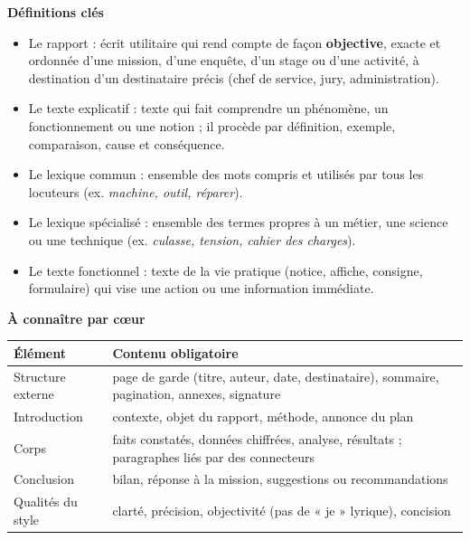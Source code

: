 \documentclass[11pt]{article}
\newcommand{\cle}[1]{{\popxbold\color{popdark}#1}}
\begin{document}
\begin{bilan}
\textbf{Définitions clés}
\begin{itemize}
\item Le \cle{rapport} : écrit utilitaire qui rend compte de façon \textbf{objective}, exacte et ordonnée d'une mission, d'une enquête, d'un stage ou d'une activité, à destination d'un destinataire précis (chef de service, jury, administration).
\item Le \cle{texte explicatif} : texte qui fait comprendre un phénomène, un fonctionnement ou une notion ; il procède par définition, exemple, comparaison, cause et conséquence.
\item Le \cle{lexique commun} : ensemble des mots compris et utilisés par tous les locuteurs (ex. \emph{machine, outil, réparer}).
\item Le \cle{lexique spécialisé} : ensemble des termes propres à un métier, une science ou une technique (ex. \emph{culasse, tension, cahier des charges}).
\item Le \cle{texte fonctionnel} : texte de la vie pratique (notice, affiche, consigne, formulaire) qui vise une action ou une information immédiate.
\end{itemize}

\textbf{À connaître par c\oe ur}
\begin{center}
\begin{tabularx}{\linewidth}{|l|X|}
\hline
\rowcolor{popblueL} \textbf{Élément} & \textbf{Contenu obligatoire} \\
\hline
Structure externe & page de garde (titre, auteur, date, destinataire), sommaire, pagination, annexes, signature \\
\hline
Introduction & contexte, objet du rapport, méthode, annonce du plan \\
\hline
Corps & faits constatés, données chiffrées, analyse, résultats ; paragraphes liés par des connecteurs \\
\hline
Conclusion & bilan, réponse à la mission, suggestions ou recommandations \\
\hline
Qualités du style & clarté, précision, objectivité (pas de « je » lyrique), concision \\
\hline
\end{tabularx}
\end{center}


\end{bilan}
\end{document}
